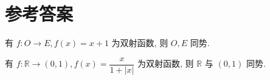 \chapter{参考答案}

\begin{answer}[\ref{prob:odd-even-union}] \label{ans:odd-even-union}
  \begin{solution}
    有 $f: O \to E, f(x) = x + 1$ 为双射函数, 则 $O, E$ 同势.
  \end{solution}
\end{answer}

\begin{answer}[\ref{prob:real-number-interval}] \label{ans:real-number-interval}
  \begin{solution}
    有 $f: \mathbb{R} \to (0, 1), f(x) = \dfrac{x}{1 + |x|}$ 为双射函数, 则 $\mathbb{R}$ 与 $(0, 1)$ 同势.
  \end{solution}
\end{answer}
